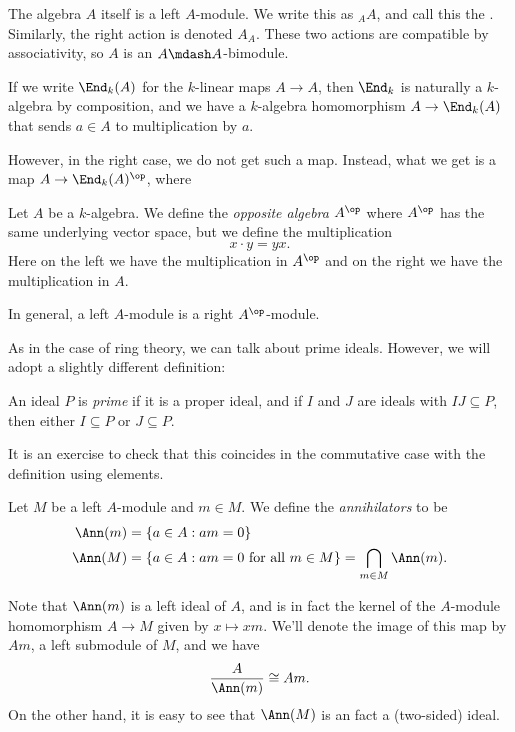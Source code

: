 \documentclass[a4paper]{article}
\begin{document}
\begin{eg}
  The algebra $A$ itself is a left $A$-module. We write this as $_A A$, and call this the . Similarly, the right action is denoted $A_A$. These two actions are compatible by associativity, so $A$ is an $A\mdash A$-bimodule.
\end{eg}

If we write $\End_k(A)$ for the $k$-linear maps $A \to A$, then $\End_k$ is naturally a $k$-algebra by composition, and we have a $k$-algebra homomorphism $A \to \End_k(A)$ that sends $a \in A$ to multiplication by $a$.

However, in the right case, we do not get such a map. Instead, what we get is a map $A \to \End_k(A)^\op$, where
\begin{defi}
  Let $A$ be a $k$-algebra. We define the \emph{opposite algebra} $A^\op$ where $A^\op$ has the same underlying vector space, but we define the multiplication
  \[
    x \cdot y = yx.
  \]
  Here on the left we have the multiplication in $A^\op$ and on the right we have the multiplication in $A$.
\end{defi}
In general, a left $A$-module is a right $A^\op$-module.

As in the case of ring theory, we can talk about prime ideals. However, we will adopt a slightly different definition:
\begin{defi}
  An ideal $P$ is \emph{prime} if it is a proper ideal, and if $I$ and $J$ are ideals with $IJ \subseteq P$, then either $I \subseteq P$ or $J \subseteq P$.
\end{defi}
It is an exercise to check that this coincides in the commutative case with the definition using elements.

\begin{defi}[Annihilator]
  Let $M$ be a left $A$-module and $m \in M$. We define the \emph{annihilators} to be
  \begin{align*}
    \Ann(m) &= \{a \in A: am = 0\}\\
    \Ann(M) &= \{a \in A: am = 0\text{ for all }m \in M\} = \bigcap_{m \in M} \Ann(m).
  \end{align*}
\end{defi}
Note that $\Ann(m)$ is a left ideal of $A$, and is in fact the kernel of the $A$-module homomorphism $A \to M$ given by $x \mapsto xm$. We'll denote the image of this map by $Am$, a left submodule of $M$, and we have
\[
  \frac{A}{\Ann(m)} \cong Am.
\]
On the other hand, it is easy to see that $\Ann(M)$ is an fact a (two-sided) ideal.
\end{document}
